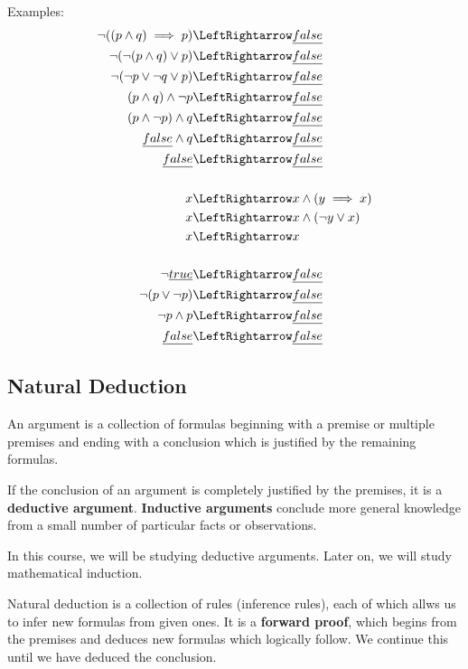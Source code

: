 \documentclass[12pt]{article}
\begin{document}
Examples:
\begin{align*}
\neg ( ( p \land q ) \implies p ) &\LeftRightarrow \emph{false}\\
\neg ( \neg ( p \land q ) \lor p ) &\LeftRightarrow \emph{false}\\
\neg ( \neg p \lor \neg q \lor p ) &\LeftRightarrow \emph{false}\\
(p \land q) \land \neg p &\LeftRightarrow \emph{false}\\
(p \land \neg p) \land q &\LeftRightarrow \emph{false}\\
\emph{false} \land q &\LeftRightarrow \emph{false}\\
\emph{false} &\LeftRightarrow \emph{false}\\\\
x &\LeftRightarrow x \land (y \implies x)\\
x &\LeftRightarrow x \land ( \neg y \lor x)\\
x &\LeftRightarrow x\\\\
\neg \emph{true} &\LeftRightarrow \emph{false}\\
\neg (p \lor \neg p) &\LeftRightarrow \emph{false}\\
\neg p \land p &\LeftRightarrow \emph{false}\\
\emph{false} &\LeftRightarrow \emph{false}\\
\end{align*}

\subsection*{Natural Deduction}
An argument is a collection of formulas beginning with a premise or multiple premises and ending with a conclusion which is justified by the remaining formulas.

If the conclusion of an argument is completely justified by the premises, it is a {\bf deductive argument}. {\bf Inductive arguments} conclude more general knowledge from a small number of particular facts or observations.

In this course, we will be studying deductive arguments. Later on, we will study mathematical induction.

Natural deduction is a collection of rules (inference rules), each of which allws us to infer new formulas from given ones. It is a {\bf forward proof}, which begins from the premises and deduces new formulas which logically follow. We continue this until we have deduced the conclusion.
\end{document}
